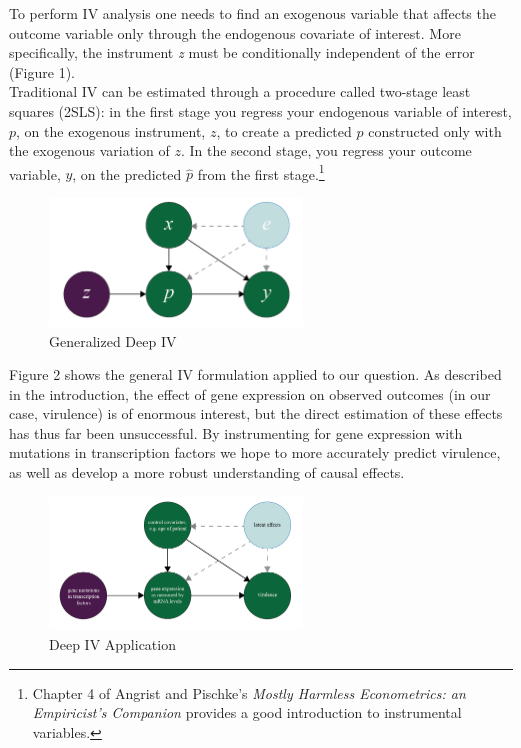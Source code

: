 \documentclass[11pt, oneside]{article}   	%
\begin{document}
To perform IV analysis one needs to find an exogenous variable that affects the outcome variable only through the endogenous covariate of interest. More specifically, the instrument \emph{z} must be conditionally independent of the error (Figure 1).\\

Traditional IV can be estimated through a procedure called two-stage least squares (2SLS): in the first stage you regress your endogenous variable of interest, $p$,  on the exogenous instrument, $z$, to create a predicted $\hat{p}$ constructed only with the exogenous variation of $z$. In the second stage, you regress your outcome variable, $y$, on the predicted $\hat{p}$ from the first stage.\footnote{Chapter 4 of Angrist and Pischke's \emph{Mostly Harmless Econometrics: an Empiricist's Companion} provides a good introduction to instrumental variables.}
 \\

\begin{figure}[h]
\caption{Generalized Deep IV}
\centering
\includegraphics[width=0.6\textwidth]{figure_1.png}
\end{figure}

Figure 2 shows the general IV formulation applied to our question. As described in the introduction, the effect of gene expression on observed outcomes (in our case, virulence) is of enormous interest, but the direct estimation of these effects has thus far been unsuccessful. By instrumenting for gene expression with mutations in transcription factors we hope to more accurately predict virulence, as well as develop a more robust understanding of causal effects.\\

\begin{figure}[h]
\caption{Deep IV Application}
\centering
\includegraphics[width=0.6\textwidth]{figure_2.png}
\end{figure} 
\end{document}
